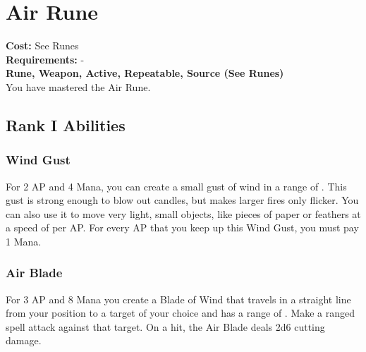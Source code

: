 \section{Air Rune}\label{rune:air}
\textbf{Cost:} See Runes\\
\textbf{Requirements:} -\\
\textbf{Rune, Weapon, Active, Repeatable, Source (See Runes)}\\
You have mastered the Air Rune.

\subsection{Rank I Abilities}

\subsubsection{Wind Gust}
For 2 AP and 4 Mana, you can create a small gust of wind in a range of .
This gust is strong enough to blow out candles, but makes larger fires only flicker.
You can also use it to move very light, small objects, like pieces of paper or feathers at a speed of  per AP.
For every AP that you keep up this Wind Gust, you must pay 1 Mana.

\subsubsection{Air Blade}
For 3 AP and 8 Mana you create a Blade of Wind that travels in a straight line from your position to a target of your choice and has a range of .
Make a ranged spell attack against that target.
On a hit, the Air Blade deals 2d6 cutting damage.